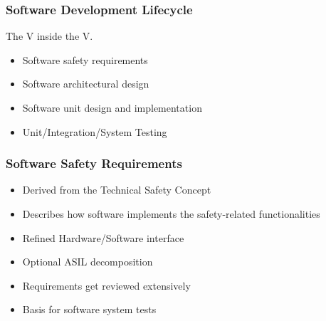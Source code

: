 \documentclass[aspectratio=169]{beamer}
\newif\iftransitions
\newcommand{\cpause}{\iftransitions \pause \fi}
\begin{document}
\begin{frame}
  \frametitle{Software Development Lifecycle}
  
  The V inside the V.
  \begin{itemize}
  \item Software safety requirements
  \item Software architectural design
  \item Software unit design and implementation
  \item Unit/Integration/System Testing
  \end{itemize}
  
\end{frame}

\begin{frame}
  \frametitle{Software Safety Requirements}
  
  \begin{itemize}
  \item Derived from the Technical Safety Concept \cpause
  \item Describes how software implements the safety-related functionalities \cpause
  \item Refined Hardware/Software interface \cpause
  \item Optional ASIL decomposition \cpause
  \item Requirements get reviewed extensively  \cpause
  \item Basis for software system tests
  \end{itemize}
  
\end{frame}
\end{document}
